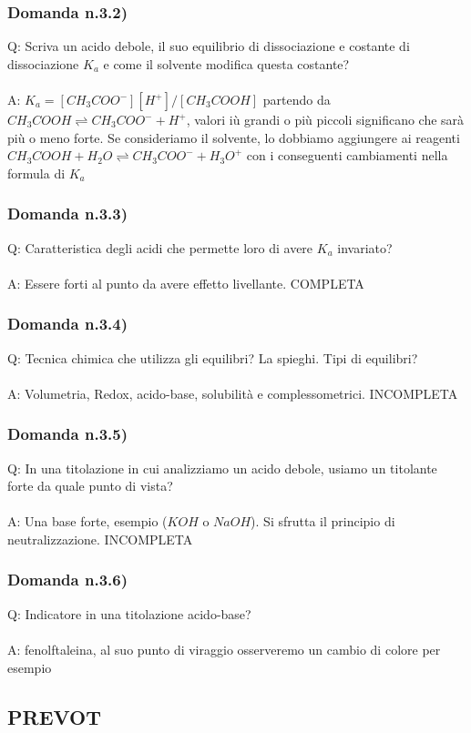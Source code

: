 \documentclass{article}
\begin{document}
\subsubsection{Domanda n.3.2)}
Q: Scriva un acido debole, il suo equilibrio di dissociazione e costante di dissociazione $K_a$ e come il solvente modifica questa costante?
\\\\
A: $K_a = [CH_3COO^-][H^+] / [CH_3COOH]$ partendo da $CH_3COOH \rightleftharpoons CH_3COO^- + H^+$, valori iù grandi o più piccoli significano che sarà più o meno forte. Se consideriamo il solvente, lo dobbiamo aggiungere ai reagenti $CH_3COOH + H_2O \rightleftharpoons CH_3COO^- + H_3O^+$ con i conseguenti cambiamenti nella formula di $K_a$
\subsubsection{Domanda n.3.3)}
Q: Caratteristica degli acidi che permette loro di avere $K_a$ invariato? 
\\\\
A: Essere forti al punto da avere effetto livellante. COMPLETA
\subsubsection{Domanda n.3.4)}
Q: Tecnica chimica che utilizza gli equilibri? La spieghi. Tipi di equilibri? 
\\\\
A: Volumetria, Redox, acido-base, solubilità e complessometrici. INCOMPLETA
\subsubsection{Domanda n.3.5)}
Q: In una titolazione in cui analizziamo un acido debole, usiamo un titolante forte da quale punto di vista?
\\\\
A: Una base forte, esempio ($KOH$ o $NaOH$). Si sfrutta il principio di neutralizzazione. INCOMPLETA
\subsubsection{Domanda n.3.6)}
Q: Indicatore in una titolazione acido-base?
\\\\
A: fenolftaleina, al suo punto di viraggio osserveremo un cambio di colore per esempio
\newpage
\subsection{PREVOT}
\end{document}
